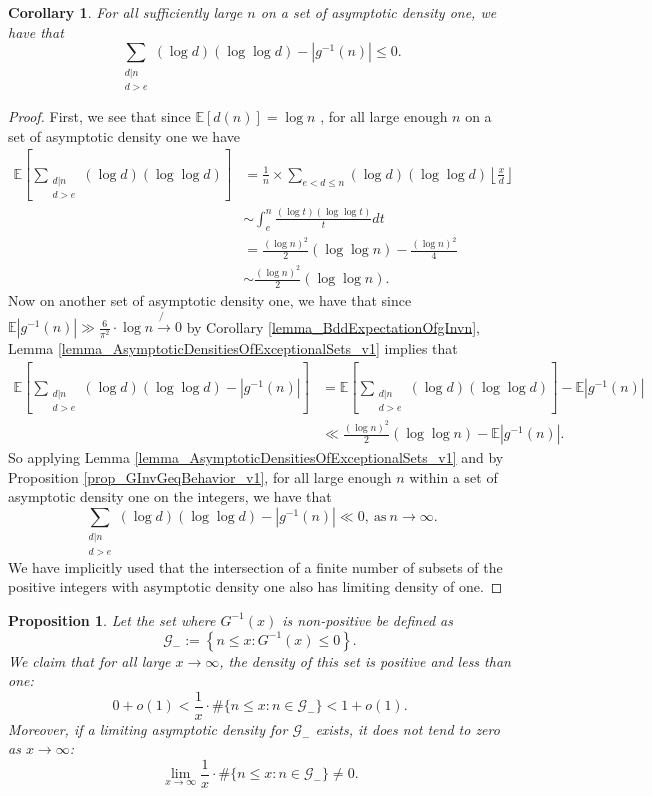 \documentclass[11pt,reqno,a4letter]{article}
\numberwithin{figure}{section}
\numberwithin{table}{section}
\newcommand{\Floor}[2]{\ensuremath{\left\lfloor \frac{#1}{#2} \right\rfloor}}
\theoremstyle{plain}
\newtheorem{prop}[theorem]{Proposition}
\newtheorem{cor}[theorem]{Corollary}
\numberwithin{theorem}{section}
\theoremstyle{definition}
\begin{document}
\begin{cor} 
\label{cor_GInvGeqBehavior_v2} 
For all sufficiently large $n$ on a set of asymptotic density one, we have that 
\[
\sum_{\substack{d|n \\ d > e}} (\log d) (\log\log d) - |g^{-1}(n)| \leq 0. 
\]
\end{cor} 
\begin{proof} 
First, we see that since $\mathbb{E}[d(n)] = \log n$ \cite[\S 27.11]{NISTHB}, 
for all large enough $n$ on a set of asymptotic density one we have 
\begin{align*} 
\mathbb{E}\left[\sum_{\substack{d|n \\ d > e}} (\log d) (\log\log d)\right] & = 
     \frac{1}{n} \times \sum_{e < d \leq n} (\log d) (\log\log d) \Floor{x}{d} \\ 
     & \sim \int_{e}^{n} \frac{(\log t) (\log\log t)}{t} dt \\ 
     & = \frac{(\log n)^2}{2} (\log\log n) - \frac{(\log n)^2}{4} \\ 
     & \sim \frac{(\log n)^2}{2} (\log\log n). 
\end{align*} 
Now on another set of asymptotic density one, we have that since 
$\mathbb{E}|g^{-1}(n)| \gg \frac{6}{\pi^2} \cdot \log n \not{\rightarrow} 0$ by 
Corollary \ref{lemma_BddExpectationOfgInvn}, 
Lemma \ref{lemma_AsymptoticDensitiesOfExceptionalSets_v1} implies that 
\begin{align*} 
\mathbb{E}\left[\sum_{\substack{d|n \\ d > e}} (\log d) (\log\log d) - |g^{-1}(n)|\right] & = 
     \mathbb{E}\left[\sum_{\substack{d|n \\ d > e}} (\log d) (\log\log d)\right] - 
     \mathbb{E}|g^{-1}(n)| \\ 
     & \ll 
     \frac{(\log n)^2}{2} (\log\log n) - \mathbb{E}|g^{-1}(n)|. 
\end{align*} 
So applying Lemma \ref{lemma_AsymptoticDensitiesOfExceptionalSets_v1} and by 
Proposition \ref{prop_GInvGeqBehavior_v1}, for all large enough $n$ 
within a set of asymptotic density one on the integers, we have that 
\[
\sum_{\substack{d|n \\ d > e}} (\log d) (\log\log d) - |g^{-1}(n)| \ll 0, 
     \mathrm{\ as\ } n \rightarrow \infty. 
\] 
We have implicitly used that the intersection of a finite number of subsets of 
the positive integers with asymptotic density one also has limiting density of one. 
\end{proof} 

\begin{prop} 
\label{prop_DensityOfGInvxPosAndBdd} 
Let the set where $G^{-1}(x)$ is non-positive be defined as 
\[
\mathcal{G}_{-} := \left\{n \leq x: G^{-1}(x) \leq 0\right\}. 
\]
We claim that for all large $x \rightarrow \infty$, the density of this set is 
positive and less than one: 
\[
0 + o(1) < \frac{1}{x} \cdot \#\{n \leq x: n \in \mathcal{G}_{-}\} < 1 + o(1). 
\]
Moreover, if a limiting asymptotic density for $\mathcal{G}_{-}$ exists, it does not 
tend to zero as $x \rightarrow \infty$: 
\[
\lim_{x \rightarrow \infty} \frac{1}{x} \cdot \#\{n \leq x: n \in \mathcal{G}_{-}\} \neq 0. 
\]
\end{prop} 
\end{document}
